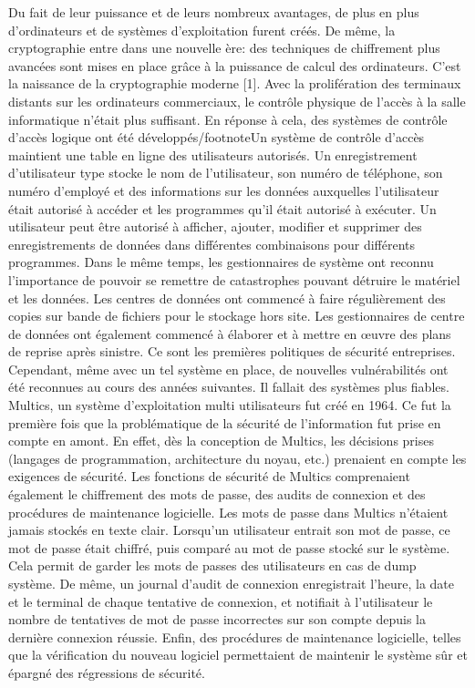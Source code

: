 Du fait de leur puissance et de leurs nombreux avantages, de plus en plus d’ordinateurs et de systèmes d’exploitation furent créés. De même, la cryptographie entre dans une nouvelle ère: des techniques de chiffrement plus avancées sont mises en place grâce à la puissance de calcul des ordinateurs. C’est la naissance de la cryptographie moderne [1].
Avec la prolifération des terminaux distants sur les ordinateurs commerciaux, le contrôle physique de l'accès à la salle informatique n'était plus suffisant. En réponse à cela, des systèmes de contrôle d'accès logique ont été développés/footnote{Un système de contrôle d'accès maintient une table en ligne des utilisateurs autorisés. Un enregistrement d'utilisateur type stocke le nom de l'utilisateur, son numéro de téléphone, son numéro d'employé et des informations sur les données auxquelles l'utilisateur était autorisé à accéder et les programmes qu'il était autorisé à exécuter. Un utilisateur peut être autorisé à afficher, ajouter, modifier et supprimer des enregistrements de données dans différentes combinaisons pour différents programmes.} Dans le même temps, les gestionnaires de système ont reconnu l'importance de pouvoir se remettre de catastrophes pouvant détruire le matériel et les données. Les centres de données ont commencé à faire régulièrement des copies sur bande de fichiers pour le stockage hors site. Les gestionnaires de centre de données ont également commencé à élaborer et à mettre en œuvre des plans de reprise après sinistre. Ce sont les premières politiques de sécurité entreprises. Cependant, même avec un tel système en place, de nouvelles vulnérabilités ont été reconnues au cours des années suivantes. Il fallait des systèmes plus fiables. 
Multics, un système d’exploitation multi utilisateurs fut créé en 1964. Ce fut la première fois que la problématique de la sécurité de l’information fut prise en compte en amont. En effet, dès la conception de Multics, les décisions prises (langages de programmation, architecture du noyau, etc.) prenaient en compte les exigences de sécurité. Les fonctions de sécurité de Multics comprenaient également le chiffrement des mots de passe, des audits de connexion et des procédures de maintenance logicielle. Les mots de passe dans Multics n’étaient jamais stockés en texte clair. Lorsqu'un utilisateur entrait son mot de passe, ce mot de passe était chiffré, puis comparé au mot de passe stocké sur le système. Cela permit de garder les mots de passes des utilisateurs en cas de dump système. De même, un journal d'audit de connexion enregistrait l'heure, la date et le terminal de chaque tentative de connexion, et notifiait à l'utilisateur le nombre de tentatives de mot de passe incorrectes sur son compte depuis la dernière connexion réussie. Enfin, des procédures de maintenance logicielle, telles que la vérification du nouveau logiciel permettaient de maintenir le système sûr et épargné des régressions de sécurité.
